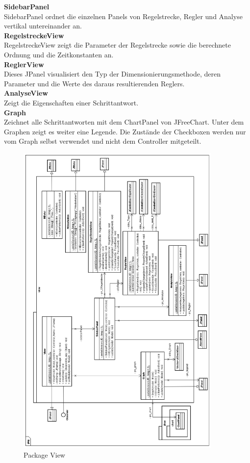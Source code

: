 \textbf{SidebarPanel}\\
SidebarPanel ordnet die einzelnen Panels von Regelstrecke, Regler und Analyse vertikal untereinander an.\\

\textbf{RegelstreckeView}\\
RegelstreckeView zeigt die Parameter der Regelstrecke sowie die berechnete Ordnung und die Zeitkonstanten an.\\

\textbf{ReglerView}\\
Dieses JPanel visualisiert den Typ der Dimensionierungsmethode, deren Parameter und die Werte des daraus resultierenden Reglers.\\

\textbf{AnalyseView}\\
Zeigt die Eigenschaften einer Schrittantwort.\\

\textbf{Graph}\\
Zeichnet alle Schrittantworten mit dem ChartPanel von JFreeChart. Unter dem Graphen zeigt es weiter eine Legende. Die Zustände der Checkboxen werden nur vom Graph selbst verwendet und nicht dem Controller mitgeteilt.

\begin{figure}[p]
\centering
\includegraphics[width=0.9\textwidth]{packview.png}
\caption{Package View}
\label{packview}
\end{figure}
